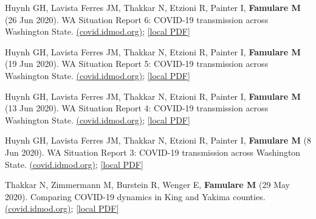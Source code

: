 \documentclass{article}
\begin{document}
\begin{llist}
\begin{items}
	\item[{[19]}] Huynh GH, Lavista Ferres JM, Thakkar N, Etzioni R, Painter I, \textbf{Famulare M} (26 Jun 2020). WA Situation Report 6: COVID-19 transmission across Washington State. \href{https://iazpvnewgrp01.blob.core.windows.net/source/2021-02/reports/pdf/WA_Situation_Report_6_COVID-19_transmission_across_Washington_State.pdf}{(covid.idmod.org)}; \href{https://famulare.github.io/assets/publication-mirror/WA_Situation_Report_6_COVID-19_transmission_across_Washington_State.pdf}{[local PDF]}
	
	\item[{[18]}] Huynh GH, Lavista Ferres JM, Thakkar N, Etzioni R, Painter I, \textbf{Famulare M} (19 Jun 2020). WA Situation Report 5: COVID-19 transmission across Washington State. \href{https://iazpvnewgrp01.blob.core.windows.net/source/2021-02/reports/pdf/WA_Situation_Report_5_COVID-19_transmission_across_Washington_State.pdf}{(covid.idmod.org)}; \href{https://famulare.github.io/assets/publication-mirror/WA_Situation_Report_5_COVID-19_transmission_across_Washington_State.pdf}{[local PDF]}
	
	\item[{[17]}] Huynh GH, Lavista Ferres JM, Thakkar N, Etzioni R, Painter I, \textbf{Famulare M} (13 Jun 2020). WA Situation Report 4: COVID-19 transmission across Washington State. \href{https://iazpvnewgrp01.blob.core.windows.net/source/2021-02/reports/pdf/WA_Situation_Report_4_COVID-19_transmission_across_Washington_State.pdf}{(covid.idmod.org)}; \href{https://famulare.github.io/assets/publication-mirror/WA_Situation_Report_4_COVID-19_transmission_across_Washington_State.pdf}{[local PDF]}
	
	\item[{[16]}] Huynh GH, Lavista Ferres JM, Thakkar N, Etzioni R, Painter I, \textbf{Famulare M} (8 Jun 2020). WA Situation Report 3: COVID-19 transmission across Washington State. \href{https://iazpvnewgrp01.blob.core.windows.net/source/2021-02/reports/pdf/WA_Situation_Report_3_COVID-19_transmission_across_Washington_State.pdf}{(covid.idmod.org)}; \href{https://famulare.github.io/assets/publication-mirror/WA_Situation_Report_3_COVID-19_transmission_across_Washington_State.pdf}{[local PDF]}
	
	\item[{[15]}] Thakkar N, Zimmermann M, Burstein R, Wenger E, \textbf{Famulare M} (29 May 2020). Comparing COVID-19 dynamics in King and Yakima counties. \href{https://iazpvnewgrp01.blob.core.windows.net/source/2021-02/reports/pdf/Comparing_COVID-19_dynamics_in_King_and_Yakima_counties.pdf}{(covid.idmod.org)}; \href{https://famulare.github.io/assets/publication-mirror/Comparing_COVID-19_dynamics_in_King_and_Yakima_counties.pdf}{[local PDF]}
	

\end{items}
\end{llist}
\end{document}
